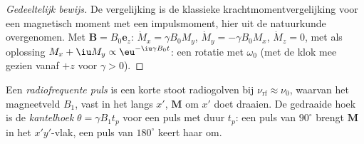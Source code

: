 \begin{proof}[Gedeeltelijk bewijs]
De vergelijking is de klassieke krachtmomentvergelijking voor een
magnetisch moment met een impulsmoment, hier uit de natuurkunde
overgenomen. Met $\mathbf B = B_0\mathbf e_z$: $\dot M_x = \gamma
B_0M_y$, $\dot M_y = -\gamma B_0M_x$, $\dot M_z = 0$, met als oplossing $M_x + \iu M_y \propto
\eu^{-\iu\gamma B_0t}$: een rotatie met $\omega_0$ (met de klok mee gezien
vanaf $+z$ voor $\gamma > 0$).
\end{proof}

\begin{definition}\label{def:b3:advanced-nmr:pulse}
Een \emph{radiofrequente puls} is een korte stoot
radiogolven bij $\nu_{\mathrm{rf}} \approx \nu_0$, waarvan het magneetveld
$B_1$, vast in het  langs $x'$, $\mathbf M$ om $x'$
doet draaien. De gedraaide hoek is de
\emph{kantelhoek} $\theta = \gamma B_1t_p$ voor een puls
met duur
$t_p$: een puls van $90^\circ$ brengt $\mathbf M$ in het $x'y'$-vlak, een
puls van $180^\circ$ keert
haar om.
\end{definition}

